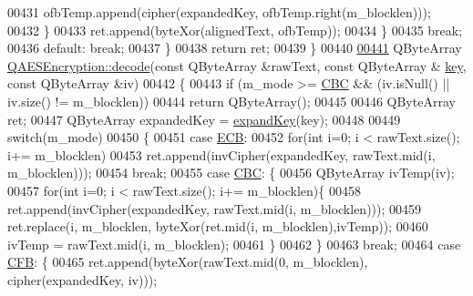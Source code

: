 \begin{DoxyCode}
00431                 ofbTemp.append(cipher(expandedKey, ofbTemp.right(m\_blocklen)));
00432             \}
00433             ret.append(byteXor(alignedText, ofbTemp));
00434         \}
00435         \textcolor{keywordflow}{break};
00436     \textcolor{keywordflow}{default}: \textcolor{keywordflow}{break};
00437     \}
00438     \textcolor{keywordflow}{return} ret;
00439 \}
00440 
\hypertarget{qaesencryption_8cpp_source.tex_l00441}{}\hyperlink{class_q_a_e_s_encryption_a58f972f2b66c2454edd5112495463bba}{00441} QByteArray \hyperlink{class_q_a_e_s_encryption_a58f972f2b66c2454edd5112495463bba}{QAESEncryption::decode}(\textcolor{keyword}{const} QByteArray &rawText, \textcolor{keyword}{const} QByteArray &
      \hyperlink{namespace_errors_dict_setup_a09c268098d09ffb8e5504f30fa6d5dd9}{key}, \textcolor{keyword}{const} QByteArray &iv)
00442 \{
00443     \textcolor{keywordflow}{if} (m\_mode >= \hyperlink{class_q_a_e_s_encryption_ad3e031c49a3d56566379d75b40b7b255a559bffc55d3599d0a172cc85aed98966}{CBC} && (iv.isNull() || iv.size() != m\_blocklen))
00444        \textcolor{keywordflow}{return} QByteArray();
00445 
00446     QByteArray ret;
00447     QByteArray expandedKey = \hyperlink{class_q_a_e_s_encryption_a5bfbb972f84a8376fceed648553c0912}{expandKey}(key);
00448 
00449     \textcolor{keywordflow}{switch}(m\_mode)
00450     \{
00451     \textcolor{keywordflow}{case} \hyperlink{class_q_a_e_s_encryption_ad3e031c49a3d56566379d75b40b7b255a4ca7f51778e2adf1f464164a0ba8e75e}{ECB}:
00452         \textcolor{keywordflow}{for}(\textcolor{keywordtype}{int} i=0; i < rawText.size(); i+= m\_blocklen)
00453             ret.append(invCipher(expandedKey, rawText.mid(i, m\_blocklen)));
00454         \textcolor{keywordflow}{break};
00455     \textcolor{keywordflow}{case} \hyperlink{class_q_a_e_s_encryption_ad3e031c49a3d56566379d75b40b7b255a559bffc55d3599d0a172cc85aed98966}{CBC}: \{
00456             QByteArray ivTemp(iv);
00457             \textcolor{keywordflow}{for}(\textcolor{keywordtype}{int} i=0; i < rawText.size(); i+= m\_blocklen)\{
00458                 ret.append(invCipher(expandedKey, rawText.mid(i, m\_blocklen)));
00459                 ret.replace(i, m\_blocklen, byteXor(ret.mid(i, m\_blocklen),ivTemp));
00460                 ivTemp = rawText.mid(i, m\_blocklen);
00461             \}
00462         \}
00463         \textcolor{keywordflow}{break};
00464     \textcolor{keywordflow}{case} \hyperlink{class_q_a_e_s_encryption_ad3e031c49a3d56566379d75b40b7b255ae5e2e019df35c7d172fcd7f0ebec5e8e}{CFB}: \{
00465             ret.append(byteXor(rawText.mid(0, m\_blocklen), cipher(expandedKey, iv)));

\end{DoxyCode}
